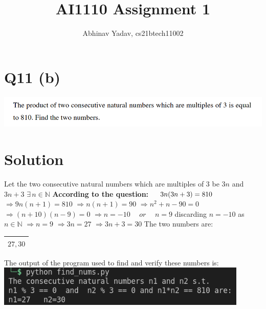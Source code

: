 \documentclass[11pt, letterpaper]{article}
\title{AI1110 Assignment 1}
\author{Abhinav Yadav, cs21btech11002}
\begin{document}
    \maketitle
    \section*{Q11 (b)}
    \includegraphics[width=\textwidth]{q11_b.png}
    \section*{Solution}
    Let the two consecutive natural numbers which are multiples of $3$ be $3n$ and $3n+3$
    \hspace{5pt} $\exists \hspace{2pt} n \in \mathbb{N}$
    \newline
    \textbf{According to the question:}\newline
    $\hspace*{12pt} 3n(3n+3) = 810$\newline
    $\Rightarrow 9n(n+1)=810$\newline
    $\Rightarrow n(n+1)=90$\newline
    $\Rightarrow n^2+n-90=0$\newline
    $\Rightarrow (n+10)(n-9)=0$\newline
    $\Rightarrow n=-10 \hspace{15pt} or \hspace{15pt} n=9$\newline
    \hspace*{11pt} discarding $n=-10$ as $n \in \mathbb{N}$\newline
    $\Rightarrow n=9$\newline
    $\Rightarrow 3n=27$\newline
    $\Rightarrow 3n+3=30$\newline
    The two numbers are:\newline
    \begin{tabular}{|c|}
        \hline
            $27, 30$\\
        \hline
    \end{tabular}\newline\newline
    The output of the program used to find and verify these numbers is:\newline
    \includegraphics[width=0.9\textwidth]{output.png}
\end{document}
